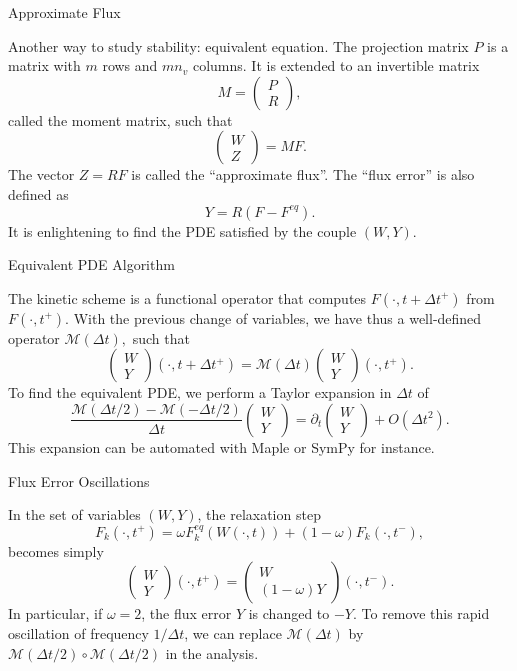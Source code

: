\documentclass[english]{beamer}
\begin{document}
\begin{frame}{Approximate Flux}

Another way to study stability: equivalent equation. The projection matrix $P$ is a matrix with $m$ rows and $mn_{v}$ columns. It is extended to an invertible matrix
\[
M=\left(\begin{array}{c}
P\\
R
\end{array}\right),
\]
called the moment matrix, such that
\[
\left(\begin{array}{c}
W\\
Z
\end{array}\right)=MF.
\]
The vector $Z=RF$ is called the ``approximate flux''. The ``flux error'' is also defined as
\[
Y=R(F-F^{eq}).
\]
It is enlightening to find the PDE satisfied by the couple $(W,Y)$.
\end{frame}
%
\begin{frame}{Equivalent PDE Algorithm}

The kinetic scheme is a functional operator that computes $F(\cdot,t+\Delta t^{+})$ from $F(\cdot,t^{+}).$ With the previous change of variables, we have thus a well-defined operator $\mathcal{M}(\Delta t),$ such that
\[
\left(\begin{array}{c}
W\\
Y
\end{array}\right)(\cdot,t+\Delta t^{+})=\mathcal{M}(\Delta t)\left(\begin{array}{c}
W\\
Y
\end{array}\right)(\cdot,t^{+}).
\]
To find the equivalent PDE, we perform a Taylor expansion in $\Delta t$ of
\[
\frac{\mathcal{M}(\Delta t/2)-\mathcal{M}(-\Delta t/2)}{\Delta t}\left(\begin{array}{c}
W\\
Y
\end{array}\right)=\partial_{t}\left(\begin{array}{c}
W\\
Y
\end{array}\right)+O(\Delta t^{2}).
\]
This expansion can be automated with Maple or SymPy for instance.
\end{frame}
%
\begin{frame}{Flux Error Oscillations}

In the set of variables $(W,Y)$, the relaxation step
\[
F_{k}(\cdot,t^{+})=\omega F_{k}^{eq}(W(\cdot,t))+(1-\omega)F_{k}(\cdot,t^{-}),
\]
becomes simply
\[
\left(\begin{array}{c}
W\\
Y
\end{array}\right)(\cdot,t^{+})=\left(\begin{array}{c}
W\\
(1-\omega)Y
\end{array}\right)(\cdot,t^{-}).
\]
In particular, if $\omega=2$, the flux error $Y$ is changed to $-Y$. To remove this rapid oscillation of frequency $1/\Delta t$, we can replace $\mathcal{M}(\Delta t)$  by $\mathcal{M}(\Delta t/2)\circ\mathcal{M}(\Delta t/2)$ in the analysis.
\end{frame}
\end{document}
